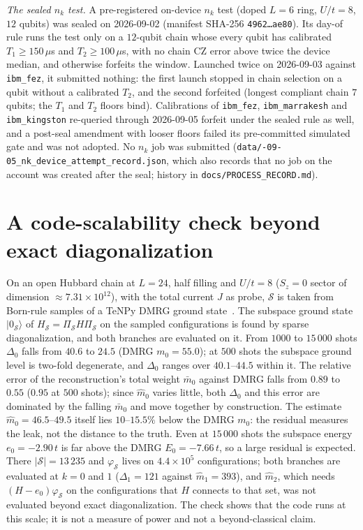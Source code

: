 \documentclass[submission, PhysCore]{SciPost}
\begin{document}
\begin{appendix}
\emph{The sealed $n_k$ test.} A pre-registered on-device $n_k$ test (doped $L=6$ ring, $U/t=8$, $12$ qubits) was sealed on 2026-09-02 (manifest SHA-256 \texttt{4962\ldots ae80}). Its day-of rule runs the test only on a $12$-qubit chain whose every qubit has calibrated $T_1\ge150\,\mu$s and $T_2\ge100\,\mu$s, with no chain CZ error above twice the device median, and otherwise forfeits the window. Launched twice on 2026-09-03 against \texttt{ibm\_fez}, it submitted nothing: the first launch stopped in chain selection on a qubit without a calibrated $T_2$, and the second forfeited (longest compliant chain $7$ qubits; the $T_1$ and $T_2$ floors bind). Calibrations of \texttt{ibm\_fez}, \texttt{ibm\_marrakesh} and \texttt{ibm\_kingston} re-queried through 2026-09-05 forfeit under the sealed rule as well, and a post-seal amendment with looser floors failed its pre-committed simulated gate and was not adopted. No $n_k$ job was submitted (\texttt{data/-09-05\_nk\_device\_\allowbreak attempt\_record.json}, which also records that no job on the account was created after the seal; history in \texttt{docs/\allowbreak PROCESS\_RECORD.md}).

\section{A code-scalability check beyond exact diagonalization}
\label{app:L24}
\label{sec:L24}
On an open Hubbard chain at $L=24$, half filling and $U/t=8$ ($S_z=0$ sector of dimension ${\approx}7.31\times10^{12}$), with the total current $J$ as probe, $\mathcal S$ is taken from Born-rule samples of a TeNPy DMRG ground state~\cite{TeNPy2024}. The subspace ground state $|0_\mathcal S\rangle$ of $H_\mathcal S=\Pi_\mathcal S H\Pi_\mathcal S$ on the sampled configurations is found by sparse diagonalization, and both branches are evaluated on it. From $1000$ to $15\,000$ shots $\Delta_0$ falls from $40.6$ to $24.5$ (DMRG $m_0=55.0$); at $500$ shots the subspace ground level is two-fold degenerate, and $\Delta_0$ ranges over $40.1$--$44.5$ within it. The relative error of the reconstruction's total weight $\bar m_0$ against DMRG falls from $0.89$ to $0.55$ ($0.95$ at $500$ shots); since $\widehat m_0$ varies little, both $\Delta_0$ and this error are dominated by the falling $\bar m_0$ and move together by construction. The estimate $\widehat m_0=46.5$--$49.5$ itself lies $10$--$15.5\%$ below the DMRG $m_0$: the residual measures the leak, not the distance to the truth. Even at $15\,000$ shots the subspace energy $e_0=-2.90\,t$ is far above the DMRG $E_0=-7.66\,t$, so a large residual is expected. There $|\mathcal S|=13\,235$ and $\varphi_\mathcal S$ lives on $4.4\times10^5$ configurations; both branches are evaluated at $k=0$ and $1$ ($\Delta_1=121$ against $\widehat m_1=393$), and $\widehat m_2$, which needs $(H-e_0)\varphi_\mathcal S$ on the configurations that $H$ connects to that set, was not evaluated beyond exact diagonalization. The check shows that the code runs at this scale; it is not a measure of power and not a beyond-classical claim.

\end{appendix}

\FloatBarrier
{\raggedright
{}

\par}

\nolinenumbers
\end{document}
